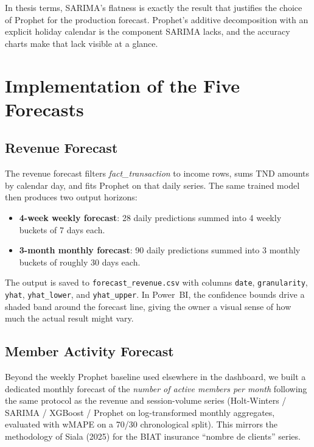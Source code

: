 In thesis terms, SARIMA's flatness is exactly the result that justifies the choice
of Prophet for the production forecast. Prophet's additive decomposition with an
explicit holiday calendar is the component SARIMA lacks, and the accuracy charts
make that lack visible at a glance.

\section{Implementation of the Five Forecasts}

\subsection{Revenue Forecast}\label{sub:revenue_forecast}

The revenue forecast filters \textit{fact\_transaction} to income rows, sums TND
amounts by calendar day, and fits Prophet on that daily series. The same trained model
then produces two output horizons:

\begin{itemize}[noitemsep]
  \item \textbf{4-week weekly forecast}: 28 daily predictions summed into 4 weekly
        buckets of 7 days each.
  \item \textbf{3-month monthly forecast}: 90 daily predictions summed into 3 monthly
        buckets of roughly 30 days each.
\end{itemize}

The output is saved to \texttt{forecast\_revenue.csv} with columns \texttt{date},
\texttt{granularity}, \texttt{yhat}, \texttt{yhat\_lower}, and \texttt{yhat\_upper}.
In Power~BI, the confidence bounds drive a shaded band around the forecast line,
giving the owner a visual sense of how much the actual result might vary.

\subsection{Member Activity Forecast}\label{sub:member_activity_forecast}

Beyond the weekly Prophet baseline used elsewhere in the dashboard, we built a
dedicated monthly forecast of the \emph{number of active members per month}
following the same protocol as the revenue and session-volume series (Holt-Winters
/ SARIMA / XGBoost / Prophet on log-transformed monthly aggregates, evaluated with
wMAPE on a 70/30 chronological split). This mirrors the methodology of Siala
(2025) for the BIAT insurance ``nombre de clients'' series.


